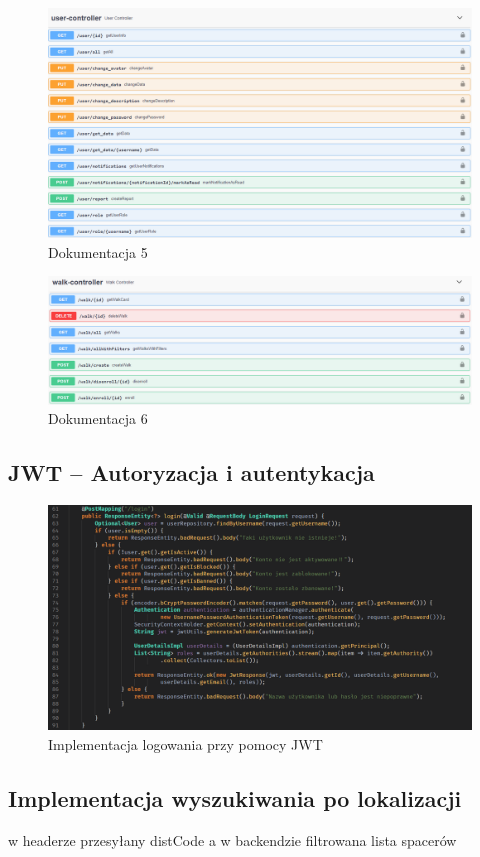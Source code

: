 \begin{figure}[H]
    \centering
    \includegraphics[width=0.7\linewidth]{rysunki/sw-5.PNG}
    \caption{Dokumentacja 5}
    \label{fig:swagger-5}
\end{figure}  
\begin{figure}[H]
    \centering
    \includegraphics[width=0.7\linewidth]{rysunki/sw-6.PNG}
    \caption{Dokumentacja 6}
    \label{fig:swagger-6}
\end{figure}  
\subsection{JWT -- Autoryzacja i autentykacja}
\begin{figure}[H]
  \centering
  \includegraphics[width=1\linewidth]{rysunki/login.PNG}
  \caption{Implementacja logowania przy pomocy JWT}
  \label{fig:JWT}
\end{figure}  

\subsection{Implementacja wyszukiwania po lokalizacji}
w headerze przesyłany distCode a w backendzie filtrowana lista spacerów

